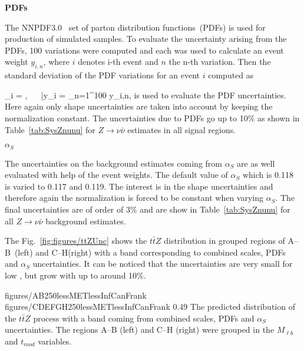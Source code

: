 
\textbf{PDFs}


The NNPDF3.0~\cite{Ball:2014uwa} set of parton distribution functions~(PDFs) is used for production of simulated samples. To evaluate the uncertainty arising from the PDFs, 100 variations were computed and each was used to calculate an event weight $y_{i,n}$, where $i$ denotes i-th event and $n$ the n-th variation. Then the standard deviation of the PDF variations for an event $i$ computed as

{
\sigma_{i} = , ~~ \bar{y}_{i} =  \sum_{n=1}^{100} y_{i,n},
}
is used to evaluate the PDF uncertainties. Here again only shape uncertainties are taken into account by keeping the normalization constant. The uncertainties due to PDFs go up to 10\% as shown in Table~\ref{tab:SysZnunu} for $Z \to \nu \bar{\nu}$ estimates in all signal regions.

\textbf{$\alpha_{S}$}

The uncertainties on the background estimates coming from $\alpha_{S}$ are as well evaluated with help of the event weights. The default value of $\alpha_{S}$ which is 0.118 is varied to 0.117 and 0.119.  The interest is in the shape uncertainties and therefore again the normalization is forced to be constant when varying $\alpha_{S}$. The final uncertainties are of order of 3\% and are show in Table~\ref{tab:SysZnunu} for all $Z \to \nu \bar{\nu}$ background estimates.


The Fig.~\ref{fig:figures/ttZUnc} shows the $t\bar{t}Z$ \MET distribution in grouped regions of A--B~(left) and C--H(right) with a band corresponding to combined scales, PDFs and $\alpha_{S}$ uncertainties. It can be noticed that the uncertainties are very small for low \MET, but grow with \MET up to around 10\%.

                 {figures/AB250lessMETlessInfCanFrank} %
                 {figures/CDEFGH250lessMETlessInfCanFrank} %
                 {0.49}       %
                 { The predicted \MET distribution of the $t\bar{t}Z$ process with a band coming from combined scales, PDFs and $\alpha_{S}$ uncertainties. The regions A--B (left) and C--H (right) were grouped in the $M_{\ell b}$ and $t_{mod}$ variables. }


